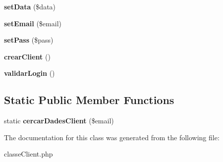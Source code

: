 \begin{DoxyCompactItemize}
\item 
{\bfseries set\+Data} (\$data)\hypertarget{classClient_a662e97313a7c40af423bfb66baea9e85}{}\label{classClient_a662e97313a7c40af423bfb66baea9e85}

\item 
{\bfseries set\+Email} (\$email)\hypertarget{classClient_a390e4810cbcebfa1c8d0188ecaaa784c}{}\label{classClient_a390e4810cbcebfa1c8d0188ecaaa784c}

\item 
{\bfseries set\+Pass} (\$pass)\hypertarget{classClient_a34feb819ffbdff0e7f39eb9952b2e547}{}\label{classClient_a34feb819ffbdff0e7f39eb9952b2e547}

\item 
{\bfseries crear\+Client} ()\hypertarget{classClient_ac8901a3c9893fa42334de127880e011f}{}\label{classClient_ac8901a3c9893fa42334de127880e011f}

\item 
{\bfseries validar\+Login} ()\hypertarget{classClient_ad312b88d33ab977843ee364917226496}{}\label{classClient_ad312b88d33ab977843ee364917226496}

\end{DoxyCompactItemize}
\subsection*{Static Public Member Functions}
\begin{DoxyCompactItemize}
\item 
static {\bfseries cercar\+Dades\+Client} (\$email)\hypertarget{classClient_a5114febc2c0ee4297d9723ab0ea928c9}{}\label{classClient_a5114febc2c0ee4297d9723ab0ea928c9}

\end{DoxyCompactItemize}


The documentation for this class was generated from the following file\+:\begin{DoxyCompactItemize}
\item 
classe\+Client.\+php\end{DoxyCompactItemize}

